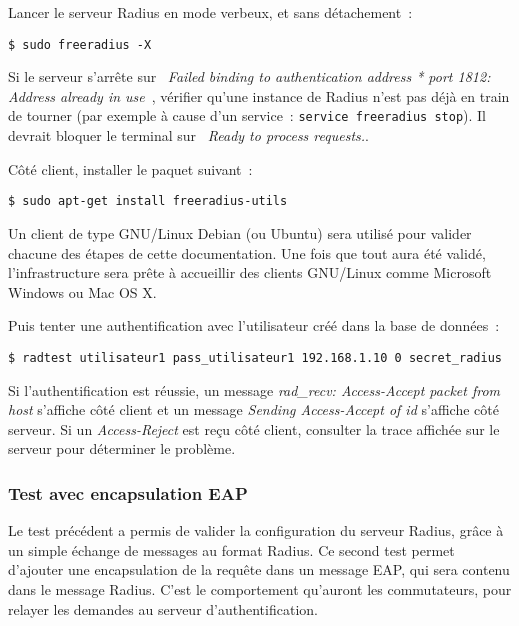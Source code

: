 \label{freeradius-x}
Lancer le serveur Radius en mode verbeux, et sans détachement~:

\begin{lstlisting}
$ sudo freeradius -X
\end{lstlisting}

Si le serveur s'arrête sur \og~\emph{Failed binding to authentication address * port 1812{}: Address already in use}~\fg{}, vérifier qu'une instance de Radius n'est pas déjà en train de tourner (par exemple à cause d'un service~: \texttt{service freeradius stop}). Il devrait bloquer le terminal sur \og~\emph{Ready to process requests.}\fg{}.

Côté client, installer le paquet suivant~:

\begin{lstlisting}
$ sudo apt-get install freeradius-utils
\end{lstlisting}

{\Large\Info} Un client de type GNU/Linux Debian (ou Ubuntu) sera utilisé pour valider chacune des étapes de cette documentation. Une fois que tout aura été validé, l'infrastructure sera prête à accueillir des clients GNU/Linux comme Microsoft Windows ou Mac OS X.

Puis tenter une authentification avec l'utilisateur créé dans la base de données~:

\begin{lstlisting}
$ radtest utilisateur1 pass_utilisateur1 192.168.1.10 0 secret_radius
\end{lstlisting}

Si l'authentification est réussie, un message \og\emph{rad\_recv: Access-Accept packet from host}\fg{} s'affiche côté client et un message \og\emph{Sending Access-Accept of id}\fg{} s'affiche côté serveur. Si un \emph{Access-Reject} est reçu côté client, consulter la trace affichée sur le serveur pour déterminer le problème.

\subsubsection{Test avec encapsulation EAP}

Le test précédent a permis de valider la configuration du serveur Radius, grâce à un simple échange de messages au format Radius. Ce second test permet d'ajouter une encapsulation de la requête dans un message EAP, qui sera contenu dans le message Radius. C'est le comportement qu'auront les commutateurs, pour relayer les demandes au serveur d'authentification.

